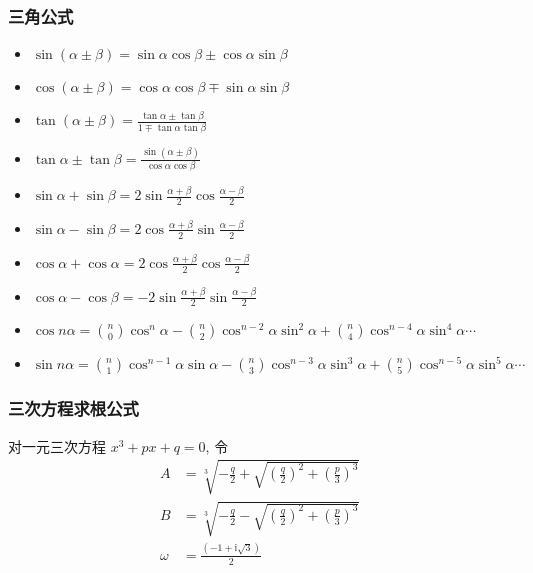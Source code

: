 \documentclass[landscape, twocolumn, 8pt, a4paper, twoside]{extarticle}
\begin{document}
    \subsubsection{三角公式}
    \begin{itemize}
    \item
      $\sin(\alpha \pm \beta) = \sin\alpha\cos\beta \pm \cos\alpha\sin\beta $
    \item
      $\cos(\alpha \pm \beta) = \cos\alpha\cos\beta \mp \sin\alpha\sin\beta $
    \item
      $\tan(\alpha \pm \beta) = \frac{\tan\alpha \pm \tan\beta}{1 \mp \tan\alpha\tan\beta} $
    \item
      $\tan\alpha \pm \tan\beta = \frac{\sin(\alpha \pm \beta)}{\cos\alpha\cos\beta} $
    \item
      $\sin\alpha+\sin\beta = 2\sin\frac{\alpha+\beta}{2}\cos\frac{\alpha-\beta}{2} $
    \item
      $\sin\alpha-\sin\beta = 2\cos\frac{\alpha+\beta}{2}\sin\frac{\alpha-\beta}{2} $
    \item
      $\cos\alpha+\cos\alpha = 2\cos\frac{\alpha+\beta}{2}\cos\frac{\alpha-\beta}{2} $
    \item
      $\cos\alpha-\cos\beta = -2\sin\frac{\alpha+\beta}{2}\sin\frac{\alpha-\beta}{2} $
    \item
      $\cos{n\alpha} =
          \binom{n}{0} \cos ^ {n} \alpha
        - \binom{n}{2} \cos ^ {n - 2} \alpha \sin ^ {2} \alpha
        + \binom{n}{4} \cos ^ {n - 4} \alpha \sin ^ {4} \alpha
      \cdots $
    \item
      $\sin{n\alpha} =
          \binom{n}{1} \cos ^ {n - 1} \alpha \sin \alpha
        - \binom{n}{3} \cos ^ {n - 3} \alpha \sin ^ {3} \alpha
        + \binom{n}{5} \cos ^ {n - 5} \alpha \sin ^ {5} \alpha
        \cdots $
    \end{itemize}
    
    \subsubsection{三次方程求根公式}
      对一元三次方程
      $x ^ 3 + px + q = 0$,
      令
      \begin{align*}
        A &= \sqrt[3]{-\frac{q}{2}+\sqrt{(\frac{q}{2})^2+(\frac{p}{3})^3}} \\
        B &= \sqrt[3]{-\frac{q}{2}-\sqrt{(\frac{q}{2})^2+(\frac{p}{3})^3}} \\ 
        \omega &= \frac{(-1 + \mathrm{i} \sqrt{3})}{2}
      \end{align*}
      
\end{document}
